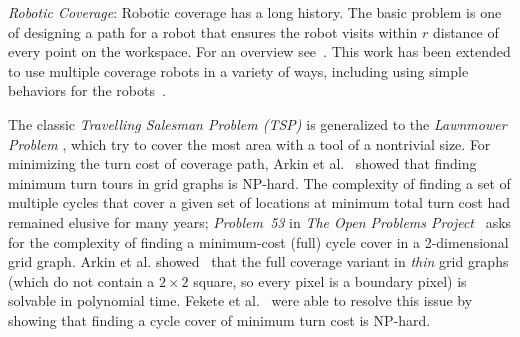 \noindent \emph{Robotic Coverage}: 
Robotic coverage has a long history. The basic problem is one of designing a path for a robot that ensures the robot visits within $r$ distance of every point on the workspace.  For an overview see~\cite{Choset2001}.  This work has been extended to use multiple coverage robots in a variety of ways, including using simple behaviors for the robots~\cite{spears2006physics,Koenig2001}.

The classic \emph{Travelling Salesman Problem (TSP)} is generalized to the \emph{Lawnmower Problem} \cite{arkin2000approximation}, which try to cover the most area with a tool of a nontrivial size.
For minimizing the turn cost of coverage path, Arkin et al.~\cite{arkin2005optimal} showed that finding minimum turn tours in grid graphs is NP-hard.
The complexity of finding a set of multiple cycles that cover a given set of locations at minimum total turn cost had remained elusive for many years; \emph{Problem~{53}} in \emph{The Open Problems Project}~\cite{openproblemproject} asks for the complexity of finding a minimum-cost (full) cycle cover in a 2-dimensional grid graph.
Arkin et al. showed~\cite{arkin2005optimal} that the full coverage variant in {\em thin} grid graphs (which do not contain a $2\times 2$ square,
so every pixel is a boundary pixel) is solvable in polynomial time. Fekete et al.~\cite{dom3} were able to resolve this issue by showing that finding a cycle cover of minimum turn cost is  NP-hard.
